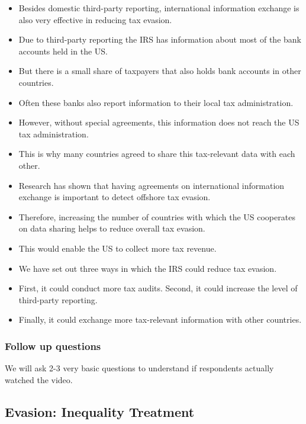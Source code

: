 \documentclass[11pt]{article}
\begin{document}
\begin{itemize}
\item Besides domestic third-party reporting, international information exchange is also very effective in reducing tax evasion. 
\item Due to third-party reporting the IRS has information about most of the bank accounts held in the US. 
\item But there is a small share of taxpayers that also holds bank accounts in other countries. 
\item Often these banks also report information to their local tax administration. 
\item However, without special agreements, this information does not reach the US tax administration. 
\item This is why many countries agreed to share this tax-relevant data with each other. 
\item Research has shown that having agreements on international information exchange is important to detect offshore tax evasion. 
\item Therefore, increasing the number of countries with which the US cooperates on data sharing helps to reduce overall tax evasion. 
\item This would enable the US to collect more tax revenue.
\item We have set out three ways in which the IRS could reduce tax evasion. 
\item First, it could conduct more tax audits. Second, it could increase the level of third-party reporting. 
\item Finally, it could exchange more tax-relevant information with other countries. 
\end{itemize}

\subsubsection*{Follow up questions}
We will ask 2-3 very basic questions to understand if respondents actually watched the video.
\subsection{Evasion: Inequality Treatment}
\end{document}
